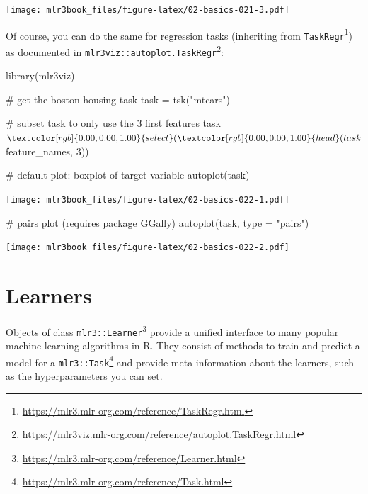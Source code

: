 \documentclass[12pt,]{scrbook}
\newenvironment{Shaded}{}{}
\newcommand{\CommentTok}[1]{\textcolor[rgb]{0.00,0.50,0.00}{#1}}
\newcommand{\DataTypeTok}[1]{#1}
\newcommand{\DecValTok}[1]{#1}
\newcommand{\KeywordTok}[1]{\textcolor[rgb]{0.00,0.00,1.00}{#1}}
\newcommand{\NormalTok}[1]{#1}
\newcommand{\OperatorTok}[1]{#1}
\newcommand{\StringTok}[1]{\textcolor[rgb]{0.00,0.50,0.50}{#1}}
\renewcommand{\href}[2]{#2\footnote{\url{#1}}}
\begin{document}
\texttt{[image: mlr3book\_files/figure-latex/02-basics-021-3.pdf]}

Of course, you can do the same for regression tasks (inheriting from \href{https://mlr3.mlr-org.com/reference/TaskRegr.html}{\texttt{TaskRegr}}) as documented in \href{https://mlr3viz.mlr-org.com/reference/autoplot.TaskRegr.html}{\texttt{mlr3viz::autoplot.TaskRegr}}:

\begin{Shaded}
\begin{Highlighting}[]
\KeywordTok{library}\NormalTok{(mlr3viz)}

\CommentTok{# get the boston housing task}
\NormalTok{task =}\StringTok{ }\KeywordTok{tsk}\NormalTok{(}\StringTok{"mtcars"}\NormalTok{)}

\CommentTok{# subset task to only use the 3 first features}
\NormalTok{task}\OperatorTok{$}\KeywordTok{select}\NormalTok{(}\KeywordTok{head}\NormalTok{(task}\OperatorTok{$}\NormalTok{feature_names, }\DecValTok{3}\NormalTok{))}

\CommentTok{# default plot: boxplot of target variable}
\KeywordTok{autoplot}\NormalTok{(task)}
\end{Highlighting}
\end{Shaded}

\texttt{[image: mlr3book\_files/figure-latex/02-basics-022-1.pdf]}

\begin{Shaded}
\begin{Highlighting}[]

\CommentTok{# pairs plot (requires package GGally)}
\KeywordTok{autoplot}\NormalTok{(task, }\DataTypeTok{type =} \StringTok{"pairs"}\NormalTok{)}
\end{Highlighting}
\end{Shaded}

\texttt{[image: mlr3book\_files/figure-latex/02-basics-022-2.pdf]}

\hypertarget{learners}{%
\section{Learners}\label{learners}}

Objects of class \href{https://mlr3.mlr-org.com/reference/Learner.html}{\texttt{mlr3::Learner}} provide a unified interface to many popular machine learning algorithms in R.
They consist of methods to train and predict a model for a \href{https://mlr3.mlr-org.com/reference/Task.html}{\texttt{mlr3::Task}} and provide meta-information about the learners, such as the hyperparameters you can set.
\end{document}
